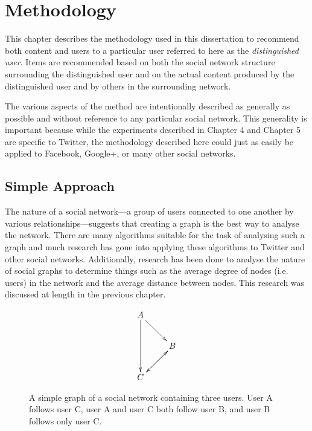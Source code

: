 \chapter{Methodology}

This chapter describes the methodology used in this dissertation to recommend both content and users to a particular user referred to here as the \emph{distinguished user}. Items are recommended based on both the social network structure surrounding the distinguished user and on the actual content produced by the distinguished user and by others in the surrounding network.

The various aspects of the method are intentionally described as generally as possible and without reference to any particular social network. This generality is important because while the experiments described in Chapter 4 and Chapter 5 are specific to Twitter, the methodology described here could just as easily be applied to Facebook, Google+, or many other social networks.

\section{Simple Approach}

The nature of a social network---a group of users connected to one another by various relationships---suggests that creating a graph is the best way to analyse the network. There are many algorithms suitable for the task of analysing such a graph and much research has gone into applying these algorithms to Twitter and other social networks. Additionally, research has been done to analyse the nature of social graphs to determine things such as the average degree of nodes (i.e. users) in the network and the average distance between nodes. This research was discussed at length in the previous chapter.

\begin{figure}
  \centering
\begin{displaymath}
  \xymatrix{
    A \ar[dr] \ar[dd] &  \\
      & B \ar[dl] \\
    C \ar[ur] & }
\end{displaymath} 
  \caption[Simple graph of a social network]{A simple graph of a social network containing three users. User A follows user C, user A and user C both follow user B, and user B follows only user C. }
\label{fig:simple_social_network_graph}
\end{figure}

